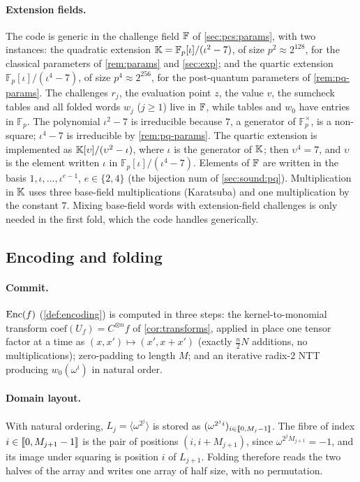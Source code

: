 \paragraph{Extension fields.}
The code is generic in the challenge field $\mathbb{F}$ of \cref{sec:pcs:params}, with two instances: the quadratic extension $\mathbb{K} = \mathbb{F}_p[\iota]/(\iota^2 - 7)$, of size $p^2 \approx 2^{128}$, for the classical parameters of \cref{rem:params} and \cref{sec:exp}; and the quartic extension $\mathbb{F}_p[\iota]/(\iota^4 - 7)$, of size $p^4 \approx 2^{256}$, for the post-quantum parameters of \cref{rem:pq-params}.
The challenges $r_j$, the evaluation point $z$, the value $v$, the sumcheck tables and all folded words $w_j$ ($j \ge 1$) live in $\mathbb{F}$, while tables and $w_0$ have entries in $\mathbb{F}_p$.
The polynomial $\iota^2 - 7$ is irreducible because $7$, a generator of $\mathbb{F}_p^\times$, is a non-square; $\iota^4 - 7$ is irreducible by \cref{rem:pq-params}.
The quartic extension is implemented as $\mathbb{K}[\upsilon]/(\upsilon^2 - \iota)$, where $\iota$ is the generator of $\mathbb{K}$; then $\upsilon^4 = 7$, and $\upsilon$ is the element written $\iota$ in $\mathbb{F}_p[\iota]/(\iota^4 - 7)$. Elements of $\mathbb{F}$ are written in the basis $1, \iota, \dots, \iota^{e-1}$, $e \in \{2, 4\}$ (the bijection $\mathrm{num}$ of \cref{sec:sound:pq}).
Multiplication in $\mathbb{K}$ uses three base-field multiplications (Karatsuba) and one multiplication by the constant $7$.
Mixing base-field words with extension-field challenges is only needed in the first fold, which the code handles generically.

\subsection{Encoding and folding}\label{sec:impl:enc}

\paragraph{Commit.}
$\mathrm{Enc}(f)$ (\cref{def:encoding}) is computed in three steps:
the kernel-to-monomial transform $\mathrm{coef}(U_f) = C^{\otimes n} f$ of \cref{cor:transforms}, applied in place one tensor factor at a time as $(x, x') \mapsto (x', x + x')$ (exactly $\tfrac{n}{2}N$ additions, no multiplications);
zero-padding to length $M$;
and an iterative radix-$2$ NTT producing $w_0(\omega^i)$ in natural order.

\paragraph{Domain layout.}
With natural ordering, $L_j = \langle \omega^{2^j} \rangle$ is stored as $(\omega^{2^j i})_{i \in \llbracket 0, M_j-1 \rrbracket}$.
The fibre of index $i \in \llbracket 0, M_{j+1}-1 \rrbracket$ is the pair of positions $(i, i + M_{j+1})$, since $\omega^{2^j M_{j+1}} = -1$, and its image under squaring is position $i$ of $L_{j+1}$.
Folding therefore reads the two halves of the array and writes one array of half size, with no permutation.


